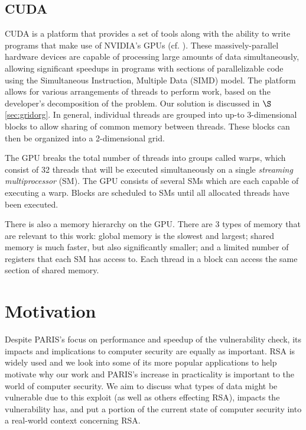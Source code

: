 \documentclass[smallextended]{svjour3}       %
\begin{document}
\subsection{CUDA}
\label{subsec:cuda}
CUDA is a platform that provides a set of tools along with the ability to 
write programs that make use of NVIDIA's GPUs (cf. 
\cite{nvidia2012programming}). These massively-parallel hardware devices are 
capable of processing large amounts of data simultaneously, allowing 
significant speedups in programs with sections of parallelizable code using 
the Simultaneous Instruction, Multiple Data (SIMD) model. The platform allows
for various arrangements of threads to perform work, based on the developer's
decomposition of the problem. Our solution is discussed in
$\S$\ref{sec:gridorg}. In general, individual threads are grouped into up-to
3-dimensional blocks to allow sharing of common memory between threads. These
blocks can then be organized into a 2-dimensional grid.  

The GPU breaks the total number of threads into groups called warps, which 
consist of 32 threads that will be executed simultaneously on a single
\textit{streaming multiprocessor} (SM). The GPU consists of several SMs which 
are each capable of executing a warp. Blocks are scheduled to SMs until all 
allocated threads have been executed. 

There is also a memory hierarchy on the GPU. There are 3 types of memory 
that are relevant to this work: global memory is the slowest and 
largest; shared memory is much faster, but also significantly smaller; and 
a limited number of registers that each SM has access to. Each thread in a
block can access the same section of shared memory.


\section{Motivation}
\label{sec:motivation}
Despite PARIS's focus on performance and speedup of the vulnerability check,
its impacts and implications to computer security are equally as important.
RSA is widely used and we look into some of its more popular applications to
help motivate why our work and PARIS's increase in practicality is important to
the world of computer security. We aim to discuss what types of data might be
vulnerable due to this exploit (as well as others effecting RSA), impacts the
vulnerability has, and put a portion of the current state of computer security
into a real-world context concerning RSA.
\end{document}
